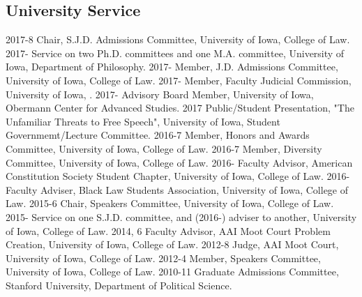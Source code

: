 \documentclass[letterpaper]{moderncv}
\begin{document}
\subsection{University Service}
\cvitem
{2017-8}
{Chair, S.J.D. Admissions Committee, University of Iowa, College of Law.}
\vspace{1mm}
\cvitem
{2017-}
{Service on two Ph.D. committees and one M.A. committee, University of Iowa, Department of Philosophy.}
\vspace{1mm}
\cvitem
{2017-}
{Member, J.D. Admissions Committee, University of Iowa, College of Law.}
\vspace{1mm}
\cvitem
{2017-}
{Member, Faculty Judicial Commission, University of Iowa, .}
\vspace{1mm}
\cvitem
{2017-}
{Advisory Board Member, University of Iowa, Obermann Center for Advanced Studies.}
\vspace{1mm}
\cvitem
{2017}
{Public/Student Presentation, "The Unfamiliar Threats to Free Speech", University of Iowa, Student Governmemt/Lecture Committee.}
\vspace{1mm}
\cvitem
{2016-7}
{Member, Honors and Awards Committee, University of Iowa, College of Law.}
\vspace{1mm}
\cvitem
{2016-7}
{Member, Diversity Committee, University of Iowa, College of Law.}
\vspace{1mm}
\cvitem
{2016-}
{Faculty Advisor, American Constitution Society Student Chapter, University of Iowa, College of Law.}
\vspace{1mm}
\cvitem
{2016-}
{Faculty Adviser, Black Law Students Association, University of Iowa, College of Law.}
\vspace{1mm}
\cvitem
{2015-6}
{Chair, Speakers Committee, University of Iowa, College of Law.}
\vspace{1mm}
\cvitem
{2015-}
{Service on one S.J.D. committee, and (2016-) adviser to another, University of Iowa, College of Law.}
\vspace{1mm}
\cvitem
{2014, 6}
{Faculty Advisor, AAI Moot Court Problem Creation, University of Iowa, College of Law.}
\vspace{1mm}
\cvitem
{2012-8}
{Judge, AAI Moot Court, University of Iowa, College of Law.}
\vspace{1mm}
\cvitem
{2012-4}
{Member, Speakers Committee, University of Iowa, College of Law.}
\vspace{1mm}
\cvitem
{2010-11}
{Graduate Admissions Committee, Stanford University, Department of Political Science.}
\vspace{1mm}
\end{document}
